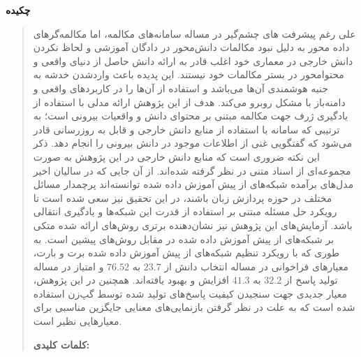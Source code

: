 \thispagestyle{empty}
\centerline{\textbf{\large{چکیده}}}
\begin{quote}

	علی رغم پیشرفت های چشم‌گیر
	در مساله سامانه‌های مکالمه، اما مکالمه‌گر‌های داده محور 
	به دلیل نبود مکالمات دانش‌محور در دادگان آموزشی و لحاظ نکردن دانش خارجی در معماری خود 
	اغلب قادر به ارائه دانش حاصل از دنیای واقعی و محتوامحور در بستر مکالمات خود نیستند. این پدیده باعث واردشدن خدشه به جنبه هوشمندی آن‌ها می‌باشد و استفاده از آن‌ها را در کاربردهای واقعی
	و دامنه‌باز
	با مشکل روبرو می‌کند.
	\newline  
	هدف از این پژوهش ارائه مدلی با استفاده از یادگیری ژرف جهت مکالمه مبتنی بر محتوای دانش و واقعیات بیرونی است؛ به ترتیبی که سامانه با استفاده از منابع دانش خارجی و قابل به روزرسانی قادر می‌شود که گفتگویی غنی از اطلاعات موجود در دانش بیرونی را انجام دهد. ذکر این نکته ضروری است که منابع دانش خارجی در این پژوهش به صورت مجموعه‌ای از اسناد متنی در نظر گرفته شده‌اند.
	\newline
	از آن جایی که در سالیان اخیر مدل‌های برآمده شبکه‌های از پیش آموزش داده شده توانسته‌اند پرچمدار مسائل مختلف در حوزه پردازش زبان باشند، در این تحقیق نیز سعی شده است تا رویکرد حل مسئله مبتنی بر استفاده از قدرت این شبکه‌ها و یادگیری انتقالی باشد. آزمایش‌های این پژوهش  نیز نشان‌دهنده برتری روش‌های ارائه شده متکی بر شبکه‌های از پیش آموزش داده شده در مقابل روش‌های پیشین است.
	به طوری که با رویکرد تنظیم شبکه‌های 
	از پیش آموزش داده شده برت و بارت،
	 معیارهای فراخوانی در مساله انتخاب دانش از 
	$23.7$
	 به 
	 $76.52$
	  و امتیاز 
	در مساله تولید پاسخ از 
	$32.2$
	 به 
	 $41.3$
	  افزایش و بهبود یافته‌اند. همچنین در این پژوهش، معیار جدیدی جهت سنجیدن کیفیت پاسخ‌های تولید شده توسط گپ‌زن استفاده 
	  شده
	  است که به علت در نظر گرفتن بازنمایی‌های معنایی جایگزین مناسبی برای معیارهایی نظیر 
	  است. 
	
	\vskip 1cm
	\textbf{کلمات کلیدی:} 
\end{quote}